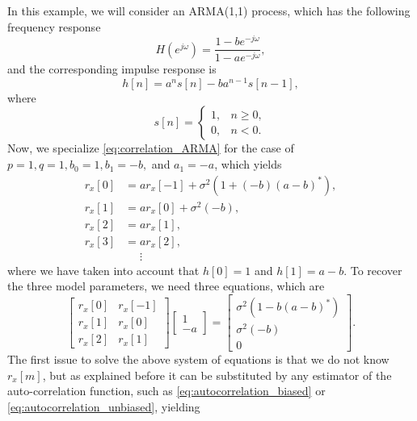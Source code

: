 \begin{example}
	
In this example, we will consider an ARMA(1,1) process, which has the following frequency response
\begin{equation*}
H(e^{j \omega}) = \frac{1 - b e^{-j \omega}}{1 - a e^{-j \omega}},
\end{equation*}
and the corresponding impulse response is
\begin{equation*}
h[n] = a^n s[n] - b a^{n-1} s[n-1],
\end{equation*}
where
\begin{equation*}
s[n] = \begin{cases}
1, & n \geq 0, \\
0, & n < 0.
\end{cases}
\end{equation*}
Now, we specialize \eqref{eq:correlation_ARMA} for the case of $p = 1, q = 1, b_0 = 1, b_1 = -b,$ and $a_1 = -a$, which yields
\begin{align*}
	r_x[0] &= a r_x[-1]  + \sigma^2 \left(1 + (-b) (a-b)^{\ast}\right), \\
	r_x[1] &= a r_x[0]  + \sigma^2  (-b), \\
	r_x[2] &= a r_x[1] , \\
	r_x[3] &= a r_x[2] , \\
	&\phantom{=} \vdots
\end{align*}
where we have taken into account that $h[0] = 1$ and $h[1] = a - b$. To recover the three model parameters, we need three equations, which are
\begin{equation*}
	\begin{bmatrix}
	r_x[0] & r_x[-1] \\
	r_x[1] & r_x[0] \\
	r_x[2] & r_x[1] 
	\end{bmatrix}
	\begin{bmatrix}
	1 \\ -a
	\end{bmatrix} = 
	\begin{bmatrix}
	\sigma^2 \left(1 - b (a-b)^{\ast}\right) \\
	\sigma^2  (-b) \\
	0
	\end{bmatrix}.
\end{equation*}
The first issue to solve the above system of equations is that we do not know $r_x[m]$, but as explained before it can be substituted by any estimator of the auto-correlation function, such as \eqref{eq:autocorrelation_biased} or \eqref{eq:autocorrelation_unbiased}, yielding

\end{example}

